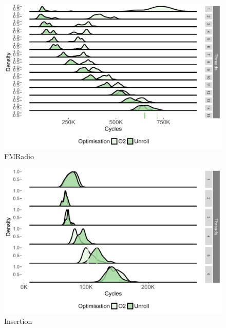 \begin{appendices}
\begin{figure}[!htb]
\center
\includegraphics[width=1\textwidth]{streamit-paper/graphics/appendixgraphs/fm-total.pdf}
\caption{FMRadio}\label{chp:stream:fmt}
\end{figure}

\begin{figure}[!htb]
\center
\includegraphics[width=1\textwidth]{streamit-paper/graphics/appendixgraphs/insertion-total.pdf}
\caption{Insertion}\label{chp:stream:it}
\end{figure}


\end{appendices}

